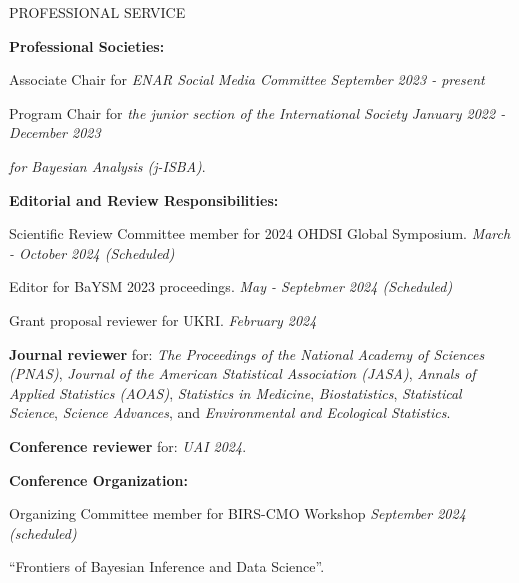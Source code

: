 \documentclass{resume} %
\begin{document}
\begin{rSection}{PROFESSIONAL SERVICE}
	
	\hspace*{-0.2in}\textbf{Professional Societies:}
	
	Associate Chair for \emph{ENAR Social Media Committee}  \hfill {\em September 2023 - present}
	
		\smallskip
	
	Program Chair for \emph{the junior section of the International Society} \hfill {\em January 2022 - December 2023}
	
	\vspace{-0.1in}
	\emph{for Bayesian Analysis (j-ISBA)}.
	
\medskip 

 \hspace*{-0.2in}\textbf{Editorial and Review Responsibilities:}
 
 	Scientific Review Committee member for 2024 OHDSI Global Symposium. 	\hfill {\em March - October 2024 (Scheduled)}
 	
 	\smallskip 
	
	Editor for BaYSM 2023 proceedings.	\hfill {\em May - Septebmer 2024 (Scheduled)}

    \smallskip 
    
    Grant proposal reviewer for UKRI.	\hfill {\em February 2024}
    
    \smallskip 
    
    \textbf{Journal reviewer} for: \emph{The Proceedings of the National Academy of Sciences (PNAS)}, \emph{Journal of the American Statistical Association (JASA)},  \emph{Annals of Applied Statistics (AOAS)}, \emph{Statistics in Medicine}, \emph{Biostatistics}, \emph{Statistical Science},  \emph{Science Advances}, and \emph{Environmental and Ecological Statistics}. 
    
    \smallskip 
    
    \textbf{Conference reviewer} for: \emph{UAI 2024}. 
    
    \medskip 

 \hspace*{-0.2in}\textbf{Conference Organization:}
 
 Organizing Committee member for BIRS-CMO Workshop	\hfill {\em September 2024 (scheduled)}
 
\vspace{-0.1in}

``Frontiers of Bayesian Inference and Data Science''. 


\end{rSection}
\end{document}
